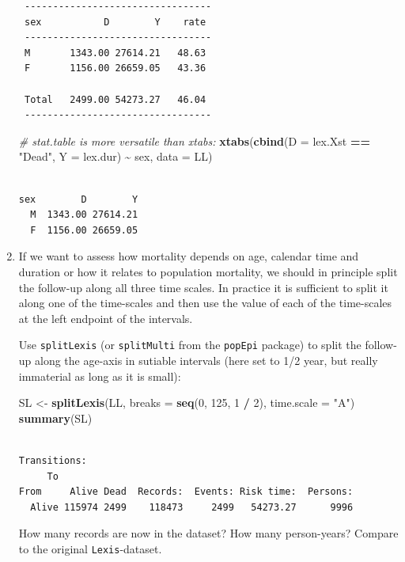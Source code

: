 \documentclass[
]{book}
\newenvironment{Shaded}{\begin{snugshade}}{\end{snugshade}}
\newcommand{\AttributeTok}[1]{\textcolor[rgb]{0.13,0.29,0.53}{#1}}
\newcommand{\CommentTok}[1]{\textcolor[rgb]{0.56,0.35,0.01}{\textit{#1}}}
\newcommand{\DecValTok}[1]{\textcolor[rgb]{0.00,0.00,0.81}{#1}}
\newcommand{\FunctionTok}[1]{\textcolor[rgb]{0.13,0.29,0.53}{\textbf{#1}}}
\newcommand{\NormalTok}[1]{#1}
\newcommand{\OtherTok}[1]{\textcolor[rgb]{0.56,0.35,0.01}{#1}}
\newcommand{\SpecialCharTok}[1]{\textcolor[rgb]{0.81,0.36,0.00}{\textbf{#1}}}
\newcommand{\StringTok}[1]{\textcolor[rgb]{0.31,0.60,0.02}{#1}}
\begin{document}
\begin{enumerate}
\begin{verbatim}
 --------------------------------- 
 sex           D        Y    rate  
 --------------------------------- 
 M       1343.00 27614.21   48.63  
 F       1156.00 26659.05   43.36  

 Total   2499.00 54273.27   46.04  
 --------------------------------- 
\end{verbatim}

\begin{Shaded}
\begin{Highlighting}[]
\CommentTok{\# stat.table is more versatile than xtabs:}
\FunctionTok{xtabs}\NormalTok{(}\FunctionTok{cbind}\NormalTok{(}\AttributeTok{D =}\NormalTok{ lex.Xst }\SpecialCharTok{==} \StringTok{"Dead"}\NormalTok{,}
            \AttributeTok{Y =}\NormalTok{ lex.dur) }
      \SpecialCharTok{\textasciitilde{}}\NormalTok{ sex, }
      \AttributeTok{data =}\NormalTok{ LL)}
\end{Highlighting}
\end{Shaded}

\begin{verbatim}

sex        D        Y
  M  1343.00 27614.21
  F  1156.00 26659.05
\end{verbatim}
\item
  If we want to assess how mortality depends on age, calendar time
  and duration or how it relates to population mortality, we should
  in principle split the follow-up along all
  three time scales. In practice it is sufficient to split it along
  one of the time-scales and then use the value of each of the
  time-scales at the left endpoint of the intervals.

  Use \texttt{splitLexis} (or \texttt{splitMulti} from the
  \texttt{popEpi} package) to split the follow-up along the
  age-axis in sutiable intervals (here set to 1/2 year, but really
  immaterial as long as it is small):

\begin{Shaded}
\begin{Highlighting}[]
\NormalTok{SL }\OtherTok{\textless{}{-}} \FunctionTok{splitLexis}\NormalTok{(LL, }
                 \AttributeTok{breaks =} \FunctionTok{seq}\NormalTok{(}\DecValTok{0}\NormalTok{, }\DecValTok{125}\NormalTok{, }\DecValTok{1} \SpecialCharTok{/} \DecValTok{2}\NormalTok{), }
             \AttributeTok{time.scale =} \StringTok{"A"}\NormalTok{)}
\FunctionTok{summary}\NormalTok{(SL)}
\end{Highlighting}
\end{Shaded}

\begin{verbatim}

Transitions:
     To
From     Alive Dead  Records:  Events: Risk time:  Persons:
  Alive 115974 2499    118473     2499   54273.27      9996
\end{verbatim}

  How many records are now in the dataset? How many person-years?
  Compare to the original \texttt{Lexis}-dataset.
\end{enumerate}
\end{document}
